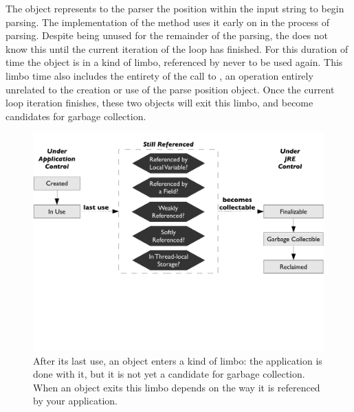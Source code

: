 
The  object represents to the parser the position within the input
string to begin parsing. The implementation of the  method uses it
early on in the process of parsing. Despite being unused for the remainder of the
parsing, the \jre does not know this until the current iteration of the loop has
finished. For this duration of time the object is in a kind of limbo, referenced
by never to be used again. This limbo time also includes the entirety of the call to
, an operation entirely unrelated to the creation or use
of the parse position object. Once the current loop iteration finishes, these two
objects will exit this limbo, and become candidates for garbage
collection.

\begin{figure}
	\centering
	\includegraphics[width=\textwidth]{part4/Figures/lifetime/states}
	\caption{After its last use, an object enters a kind of limbo: the application
	is done with it, but it is not yet a candidate for garbage collection. When an
	object exits this limbo depends on the way it is referenced by your
	application.}
		\label{fig:limbo-exit}
\end{figure}

